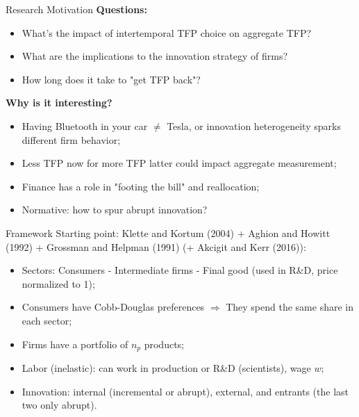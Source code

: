 \documentclass[11pt]{beamer}
\begin{document}
\begin{frame}{Research Motivation}
	\textbf{Questions:}
	\begin{itemize}\itemsep12pt
		\item What's the impact of intertemporal TFP choice on aggregate TFP?
		\item What are the implications to the innovation strategy of firms? 
		\item How long does it take to "get TFP back"?
	\end{itemize}	 
	\textbf{Why is it interesting?}
    \begin{itemize}\itemsep12pt
	\item Having Bluetooth in your car $\neq$ Tesla, or innovation heterogeneity sparks different firm behavior;
	\item Less TFP now for more TFP latter could impact aggregate measurement;
	\item Finance has a role in "footing the bill" and reallocation;
	\item Normative: how to spur abrupt innovation?
	\end{itemize}
\end{frame}

\begin{frame}{Framework}
	Starting point: Klette and Kortum (2004) + Aghion and Howitt (1992) + Grossman and Helpman (1991) (+ Akcigit and Kerr (2016)):
	\begin{itemize}\itemsep12pt	
	\item Sectors: Consumers - Intermediate firms - Final good (used in R\&D, price normalized to 1);
	\item Consumers have Cobb-Douglas preferences $\Rightarrow$ They spend the same share in each sector;
	\item Firms have a portfolio of $n_p$ products;
	\item Labor (inelastic): can work in production or R\&D (scientists), wage $w$;
	\item Innovation: internal (incremental or abrupt), external, and entrants (the last two only abrupt).
	\end{itemize}
\end{frame}

\end{document}
